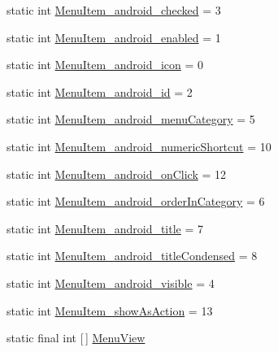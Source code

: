 \begin{DoxyCompactItemize}
\item 
static int \hyperlink{classandroid_1_1support_1_1v7_1_1mediarouter_1_1R_1_1styleable_a5f9110ca34955eafc1b143d24ae94ff9}{Menu\+Item\+\_\+android\+\_\+checked} = 3
\item 
static int \hyperlink{classandroid_1_1support_1_1v7_1_1mediarouter_1_1R_1_1styleable_a294de794a49feae55004e44239e424db}{Menu\+Item\+\_\+android\+\_\+enabled} = 1
\item 
static int \hyperlink{classandroid_1_1support_1_1v7_1_1mediarouter_1_1R_1_1styleable_a0c24c2aeee730bc922ae77f16c7943dc}{Menu\+Item\+\_\+android\+\_\+icon} = 0
\item 
static int \hyperlink{classandroid_1_1support_1_1v7_1_1mediarouter_1_1R_1_1styleable_ab839f8e9d62f6bd107255d2df7efc082}{Menu\+Item\+\_\+android\+\_\+id} = 2
\item 
static int \hyperlink{classandroid_1_1support_1_1v7_1_1mediarouter_1_1R_1_1styleable_a16cb018cf379e9b666160eda49a4273f}{Menu\+Item\+\_\+android\+\_\+menu\+Category} = 5
\item 
static int \hyperlink{classandroid_1_1support_1_1v7_1_1mediarouter_1_1R_1_1styleable_a04f5aceeca0d8b89d3a498c2886ca414}{Menu\+Item\+\_\+android\+\_\+numeric\+Shortcut} = 10
\item 
static int \hyperlink{classandroid_1_1support_1_1v7_1_1mediarouter_1_1R_1_1styleable_a7e25b52cd1383264d67ed1d8c6a5f65b}{Menu\+Item\+\_\+android\+\_\+on\+Click} = 12
\item 
static int \hyperlink{classandroid_1_1support_1_1v7_1_1mediarouter_1_1R_1_1styleable_acbad304663f7326b17ab0fa5039c800d}{Menu\+Item\+\_\+android\+\_\+order\+In\+Category} = 6
\item 
static int \hyperlink{classandroid_1_1support_1_1v7_1_1mediarouter_1_1R_1_1styleable_a71817eb2dd1f553929554a4f7e1da381}{Menu\+Item\+\_\+android\+\_\+title} = 7
\item 
static int \hyperlink{classandroid_1_1support_1_1v7_1_1mediarouter_1_1R_1_1styleable_a8dc58f0399700cf168f2710f0d92a4d1}{Menu\+Item\+\_\+android\+\_\+title\+Condensed} = 8
\item 
static int \hyperlink{classandroid_1_1support_1_1v7_1_1mediarouter_1_1R_1_1styleable_a98a3c8d572abe706878f74a89c247b11}{Menu\+Item\+\_\+android\+\_\+visible} = 4
\item 
static int \hyperlink{classandroid_1_1support_1_1v7_1_1mediarouter_1_1R_1_1styleable_ab4d2223f247d789c35977fff5fedfcca}{Menu\+Item\+\_\+show\+As\+Action} = 13
\item 
static final int \mbox{[}$\,$\mbox{]} \hyperlink{classandroid_1_1support_1_1v7_1_1mediarouter_1_1R_1_1styleable_a1d8b1d577f8163d3bb95f228f10016c7}{Menu\+View}

\end{DoxyCompactItemize}
